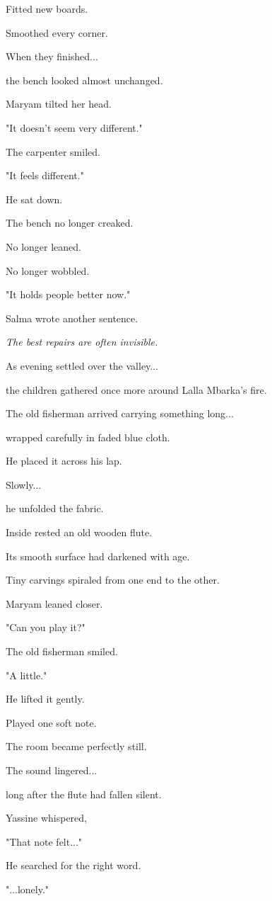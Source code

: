 \documentclass[12pt,openany]{book}
\begin{document}
Fitted new boards.

Smoothed every corner.

When they finished...

the bench looked almost unchanged.

Maryam tilted her head.

"It doesn't seem very different."

The carpenter smiled.

"It feels different."

He sat down.

The bench no longer creaked.

No longer leaned.

No longer wobbled.

"It holds people better now."

Salma wrote another sentence.

\emph{The best repairs are often invisible.}

As evening settled over the valley...

the children gathered once more around Lalla Mbarka's fire.

The old fisherman arrived carrying something long...

wrapped carefully in faded blue cloth.

He placed it across his lap.

Slowly...

he unfolded the fabric.

Inside rested an old wooden flute.

Its smooth surface had darkened with age.

Tiny carvings spiraled from one end to the other.

Maryam leaned closer.

"Can you play it?"

The old fisherman smiled.

"A little."

He lifted it gently.

Played one soft note.

The room became perfectly still.

The sound lingered...

long after the flute had fallen silent.

Yassine whispered,

"That note felt..."

He searched for the right word.

"...lonely."
\end{document}
